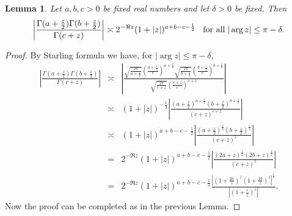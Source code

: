 \documentclass[11pt,reqno]{amsart}
\newtheorem{lemma}[theorem]{Lemma}
\theoremstyle{definition}
\theoremstyle{definition}
\numberwithin{equation}{section}
\begin{document}
\begin{lemma}\label{estimate-c-function}
Let $a,  b, c>0$ be fixed real numbers and let  $\delta>0$ be fixed. Then
$$
\left|\frac{\Gamma(a+\frac z2) \Gamma(b + \frac z2)}{\Gamma(c+z)}\right|\asymp 2^{-\Re z}(1+|z|)^{a + b-c-\frac 12}\hspace{3mm}\textup{for all}\hspace{1mm}|\arg z|\leq\pi-\delta.
$$
\end{lemma}
\begin{proof}
 By Starling formula we have, for $|\arg z|\leq \pi-\delta$, 
\begin{eqnarray*}
\left|\frac{\Gamma(a+\frac{z}{2})\Gamma(b+\frac{z}{2})}{\Gamma(c+z)}\right|&\asymp& \left|\frac{\sqrt{\frac{2\pi}{a+\frac{z}{2}}}(\frac{a+\frac{z}{2}}{e})^{a+\frac{z}{2}}\sqrt{\frac{2\pi}{b+\frac{z}{2}}}(\frac{b+\frac{z}{2}}{e})^{b+\frac{z}{2}}}{\sqrt{\frac{2\pi}{c+z}}(\frac{c+z}{e})^{c+z}}\right|\\
&\asymp & (1+|z|)^{-\frac{1}{2}}\left|\frac{(a+\frac{z}{2})^{a+\frac{z}{2}}(b+\frac{z}{2})^{b+\frac{z}{2}}}{(c+z)^{c+z}}\right|\\
& \asymp & (1+|z|)^{a+b-c-\frac{1}{2}}\left|\frac{(a+\frac{z}{2})^{\frac{z}{2}}(b+ \frac{z}{2})^{\frac{z}{2}}}{(c+z)^{z}}\right|\\
&=& 2^{-\Re z}(1+|z|)^{a+b-c-\frac{1}{2}}\left|\frac{(2a+z)^{\frac{z}{2}}(2b+z)^{\frac{z}{2}}}{(c+z)^{z}}\right|\\
&=& 2^{-\Re z}(1+|z|)^{a+b-c-\frac{1}{2}}\frac{\left|(1+\frac{2a}{z})^{z}(1+\frac{2b}{z})^{z}\right|^{\frac{1}{2}}}{\left|(1+\frac{c}{z})^{z}\right|}.
\end{eqnarray*}
Now the proof can be completed as in the previous Lemma.
\end{proof}
\end{document}
